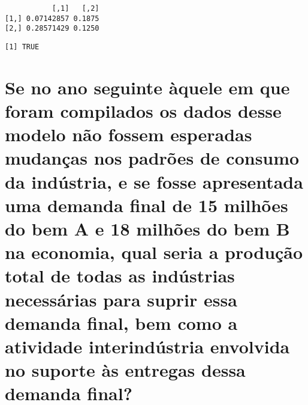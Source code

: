 \documentclass[
  letterpaper,
  DIV=11,
  numbers=noendperiod]{scrreprt}
\newenvironment{Shaded}{\begin{snugshade}}{\end{snugshade}}
\newcommand{\CommentTok}[1]{\textcolor[rgb]{0.50,0.62,0.50}{#1}}
\newcommand{\DecValTok}[1]{\textcolor[rgb]{0.86,0.86,0.80}{#1}}
\newcommand{\FunctionTok}[1]{\textcolor[rgb]{0.94,0.94,0.56}{#1}}
\newcommand{\NormalTok}[1]{\textcolor[rgb]{0.80,0.80,0.80}{#1}}
\newcommand{\OtherTok}[1]{\textcolor[rgb]{0.94,0.94,0.56}{#1}}
\newcommand{\SpecialCharTok}[1]{\textcolor[rgb]{0.86,0.64,0.64}{#1}}
\begin{document}
\begin{Shaded}
\end{Shaded}

\begin{verbatim}
           [,1]   [,2]
[1,] 0.07142857 0.1875
[2,] 0.28571429 0.1250
\end{verbatim}

\begin{Shaded}
\end{Shaded}

\begin{verbatim}
[1] TRUE
\end{verbatim}

\section{Se no ano seguinte àquele em que foram compilados os dados
desse modelo não fossem esperadas mudanças nos padrões de consumo da
indústria, e se fosse apresentada uma demanda final de 15 milhões do bem
A e 18 milhões do bem B na economia, qual seria a produção total de
todas as indústrias necessárias para suprir essa demanda final, bem como
a atividade interindústria envolvida no suporte às entregas dessa
demanda
final?}\label{se-no-ano-seguinte-uxe0quele-em-que-foram-compilados-os-dados-desse-modelo-nuxe3o-fossem-esperadas-mudanuxe7as-nos-padruxf5es-de-consumo-da-induxfastria-e-se-fosse-apresentada-uma-demanda-final-de-15-milhuxf5es-do-bem-a-e-18-milhuxf5es-do-bem-b-na-economia-qual-seria-a-produuxe7uxe3o-total-de-todas-as-induxfastrias-necessuxe1rias-para-suprir-essa-demanda-final-bem-como-a-atividade-interinduxfastria-envolvida-no-suporte-uxe0s-entregas-dessa-demanda-final}

\begin{Shaded}
\end{Shaded}
\end{document}
